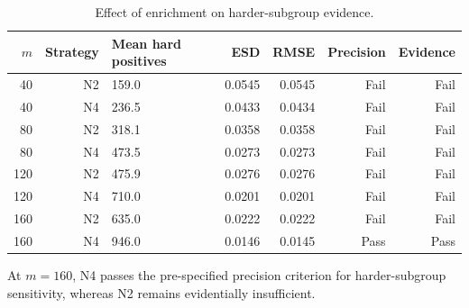 \begin{table}[h!]
\centering
\small
\caption{Effect of enrichment on harder-subgroup evidence.}
\label{tab:nav-hard-evidence}
\begin{tabular}{rrlrrrr}
\toprule
$m$ & Strategy & Mean hard positives & ESD & RMSE & Precision & Evidence \\
\midrule
40 & N2 & 159.0 & 0.0545 & 0.0545 & Fail & Fail \\
40 & N4 & 236.5 & 0.0433 & 0.0434 & Fail & Fail \\
80 & N2 & 318.1 & 0.0358 & 0.0358 & Fail & Fail \\
80 & N4 & 473.5 & 0.0273 & 0.0273 & Fail & Fail \\
120 & N2 & 475.9 & 0.0276 & 0.0276 & Fail & Fail \\
120 & N4 & 710.0 & 0.0201 & 0.0201 & Fail & Fail \\
160 & N2 & 635.0 & 0.0222 & 0.0222 & Fail & Fail \\
160 & N4 & 946.0 & 0.0146 & 0.0145 & Pass & Pass \\
\bottomrule
\end{tabular}
\par\vspace{2pt}
\begin{minipage}{0.97\linewidth}\footnotesize At $m=160$, N4 passes the pre-specified precision criterion for harder-subgroup sensitivity, whereas N2 remains evidentially insufficient.\end{minipage}
\end{table}

